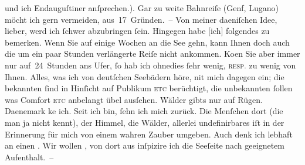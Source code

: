 \begin{ledgroupsized}[t]{13cm}
               und ich Endauguſtiner anſprechen.). Gar zu weite Bahnreiſe (Genf, Lugano) möcht ich
               gern vermeiden, {\pb}aus 17 Gründen. – Von meiner
                  daeniſchen Idee, lieber,
               werd ich ſchwer abzubringen ſein. Hingegen habe {[}ich{]} folgendes zu
               bemerken. Wenn Sie auf einige Wochen an die See gehn, kann Ihnen doch auch die um ein paar Stunden
               verlängerte Reiſe nicht ankommen. Ko{\geminationm}en Sie aber immer
               nur auf 24 Stunden ans Ufer, ſo hab ich ohnedies ſehr wenig, \textsc{resp\textcolor{gray}{.}} zu wenig von Ihnen. Alles, was ich von deutſchen Seebädern höre, ni{\geminationm}t
               mich dagegen ein; die bekannten {\pb}ſind in
               Hinſicht auf Publikum \textsc{etc} berüchtigt, die unbekannten
               ſollen was Comfor\strikeout{\textcolor{gray}{×}}t \textsc{etc} anbelangt übel ausſehen. Wälder gibts nur auf
                  Rügen. Daenemark ke{\geminationn} ich. Seit ich \label{K_L03003-4v}\label{K_L03003-4h} bin, ſehn ich mich zurück. Die Menſchen dort (die man ja nicht kennt), der
               Himmel, die Wälder, allerlei undefinirbares iſt in der Erinnerung für mich von einem
               wahren Zauber umgeben. Auch denk ich lebhaft an einen \label{K_L03003-5v}\label{K_L03003-5h}. Wir wollen
                  \label{K_L03003-6v}\label{K_L03003-6h}, von dort aus inſpizire
               ich die Seeſeite nach geeignetem
               Aufenthalt. –\pend
           \pstart

\end{ledgroupsized}
